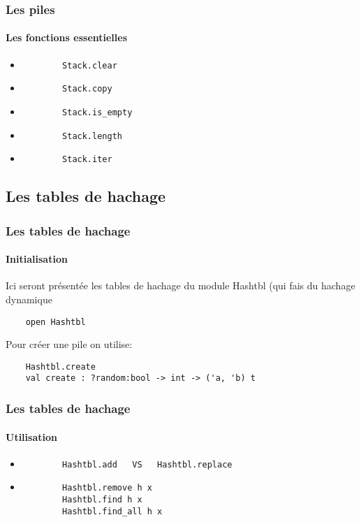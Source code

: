 \begin{frame}[fragile]
\frametitle{Les piles}
\framesubtitle{Les fonctions essentielles}
	\begin{itemize}
	
	\item
		\begin{lstlisting}
		Stack.clear
		\end{lstlisting}

	\item
		\begin{lstlisting}
		Stack.copy
		\end{lstlisting}	

	\item
		\begin{lstlisting}
		Stack.is_empty
		\end{lstlisting}	

	\item
		\begin{lstlisting}
		Stack.length
		\end{lstlisting}	

	\item
		\begin{lstlisting}
		Stack.iter
		\end{lstlisting}

	\end{itemize}

\end{frame}



\subsection{Les tables de hachage}
\begin{frame}[fragile]
\frametitle{Les tables de hachage}
\framesubtitle{Initialisation}
	Ici seront présentée les tables de hachage du module Hashtbl (qui fais du hachage dynamique
	\begin{lstlisting}
	open Hashtbl
	\end{lstlisting}
	Pour créer une pile on utilise:
	\begin{lstlisting}
	Hashtbl.create
	val create : ?random:bool -> int -> ('a, 'b) t
	\end{lstlisting}
\end{frame}

\begin{frame}[fragile]
\frametitle{Les tables de hachage}
\framesubtitle{Utilisation}
	\begin{itemize}
	
	\item
		\begin{lstlisting}
		Hashtbl.add   VS   Hashtbl.replace
		\end{lstlisting}	
	
	\item
		\begin{lstlisting}
		Hashtbl.remove h x
		Hashtbl.find h x
		Hashtbl.find_all h x
		\end{lstlisting}	

	\end{itemize}


\end{frame}

